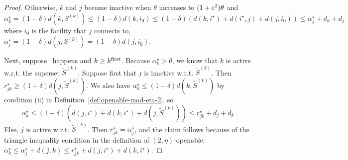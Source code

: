 \begin{proof}
    Otherwise, $k$ and $j$ become inactive when $\theta$ increases to $(1+\varepsilon^2)\theta$ and 
    \[
        \alpha^\star_k = (1-\delta)d(k,S^{(k)}) \le (1-\delta)d(k,i_0) \le (1-\delta)(d(k,i^\star) + d(i^\star,j) + d(j,i_0)) \le \alpha^\star_j + d_k + d_j
    \]
    where $i_0$ is the facility that $j$ connects to, $\alpha^\star_j = (1-\delta)d(j,S^{(k)}) = (1-\delta)d(j,i_0)$. 

    Next, suppose \specialevent\ happens and $k \geq k^{\mathrm{first}}$.
    Because $\alpha_k^\star > \theta$, we know that $k$ is active w.r.t. the superset $\tilde{S}^{(k)}$.
    Suppose first that $j$ is inactive w.r.t. $\tilde{S}^{(k)}$.
    Then $r^\star_{jk} \geq (1-\delta) d(j, \tilde{S}^{(k)})$.
    We also have $\alpha_k^\star \leq (1-\delta) d(k, \tilde{S}^{(k)})$ by condition (ii) in Definition~\ref{def:openable-mod-eta-2}, so
    \[\alpha_k^\star \leq (1-\delta) (d(j,i^\star) + d(k,i^\star) + d(j,\tilde{S}^{(k)})) \leq r^\star_{jk} + d_j + d_k\,.\]
    Else, $j$ is active w.r.t. $\tilde{S}^{(k)}$.
    Then $r^\star_{jk} = \alpha^\star_j$, and the claim follows because of the triangle inequality condition in the definition of $(2,\eta)$-openable: $\alpha^\star_k \leq \alpha^\star_j + d(j, k) \leq r^\star_{jk} + d(j, i^\star) + d(k, i^\star)$.
\end{proof}

